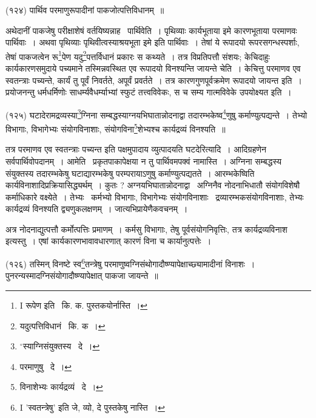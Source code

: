 \documentclass[11pt, openany]{book}
\begin{document}
{\hangindent=2cm {\knu (१२४) पार्थिव परमाणुरूपादीनां पाकजोत्पत्तिविधानम्~॥}

अथेदानीं पाकजेषु परीक्षाशेषं वर्तयिष्यन्नाह \textendash\ {\knu पार्थिवेति~।} पृथिव्याः कार्यभूताया इमे कारणभूताया परमाणवः पार्थिवाः~। अथवा पृथिव्याः पृथिवीत्वस्याश्रयभूता इमे इति पार्थिवाः~। तेषां ये रूपादयो रूपरसगन्धस्पर्शाः, तेषां पाकजत्वेन रू\renewcommand{\thefootnote}{1}\footnote{I रूपेण इति \textendash\ कि. क. पुस्तकयोर्नास्ति~।}पेण यदु\renewcommand{\thefootnote}{2}\footnote{यदुत्पत्तिविधानं \textendash\ कि. क~।}पत्तर्विधानं प्रकारः स कथ्यते~। तत्र विप्रतिपत्तौ संशयः; केचिदाहुः कार्यकारणसमुदाये पच्यमाने तस्मिन्नवस्थित एव रूपादयो विनश्यन्ति जायन्ते चेति~। केचित्तु परमाणव एव स्वतन्त्राः पच्यन्ते, कार्यं तु पूर्वं निवर्तते, अपूर्वं प्रवर्तते~। तत्र कारणगुणपूर्वक्रमेण रूपादयो जायन्त इति~। प्रयोजनन्तु धर्मधर्मिणोः साधर्म्यवैधर्म्याभ्यां स्फुटं तत्त्वविवेकः, स च सम्य गात्मविवेके उपयोक्ष्यत इति~।

\hangindent=2cm {\knu (१२५) घटादेरामद्रव्यस्या\renewcommand{\thefootnote}{3}\footnote{ ${}^\circ$स्याग्निसंयुक्तस्य \textendash\ दे~।}ग्निना सम्बद्धस्याग्नयभिघातान्नोदनाद्वा तदारम्भकेष्व\renewcommand{\thefootnote}{4}\footnote{परमाणुषु \textendash\ दे~।}णुषु कर्माण्युत्पद्यन्ते~। तेभ्यो विभागाः, विभागेभ्यः संयोगविनाशाः, संयोगविना\renewcommand{\thefootnote}{5}\footnote{विनाशेभ्यः कार्यद्रव्यं \textendash\ दे~।}शेभ्यश्च कार्यद्रव्यं विनश्यति~॥}

तत्र परमाणव एव स्वतन्त्राः पच्यन्त इति पक्षमुपादाय व्युत्पादयति {\knu घटदेरित्यादि~।} आदिग्रहणेन सर्वपार्थिवोपदानम्~। {\knu आमेति} \textendash\ प्रकृतपाकापेक्षया न तु पार्थिवमपक्वं नामास्ति~। अग्निना सम्बद्धस्य संयुक्तस्य तदारम्भकेषु घटाद्यारम्भकेषु परम्परायाऽणुषु कर्माण्युत्पद्यतते~। {\knu आरम्भकेष्विति} कार्यविनाशादिप्रक्रियासिद्ध्यर्थम्~। कुतः ? {\knu अग्नयभिघातान्नोदनाद्वा} \textendash\ अग्निनैव नोदनाभिधातौ संयोगविशेषौ
कर्माधिकारे वक्ष्येते~। तेभ्यः \textendash\ कर्मभ्यो विभागाः, विभागेभ्यः
संयोगविनाशाः \textendash\ द्रव्यारम्भकसंयोगविनाशाः, तेभ्यः कार्यद्रव्यं विनश्यति
द्व्यणुकलक्षणम्~। जात्यभिप्रायेणैकवचनम्~। 

\newpage
अत्र नोदनाद्युत्पत्तौ कर्मोत्पत्तिः प्रमाणम्~। कर्मसु विभागाः, तेषु पूर्वसंयोगनिवृत्तिः, तत्र कार्यद्रव्यविनाश इत्यस्तु~। एषां कार्यकारणभावावधारणात् कारणं विना च कार्यानुत्पत्तेः~।

\hangindent=2cm {\knu (१२६) तस्मिन् विनष्टे स्व\renewcommand{\thefootnote}{1}\footnote{I 'स्वतन्त्रेषु' इति जे, व्यो, दे पुस्तकेषु नास्ति~।}तन्त्रेषु परमाणुष्वग्निसंथोगादौष्ण्यापेक्षाच्छ्यामादीनां विनाशः~। पुनरन्यस्मादग्निसंयोगादौष्ण्यापेक्षात् पाकजा जायन्ते~॥}

}
\end{document}
